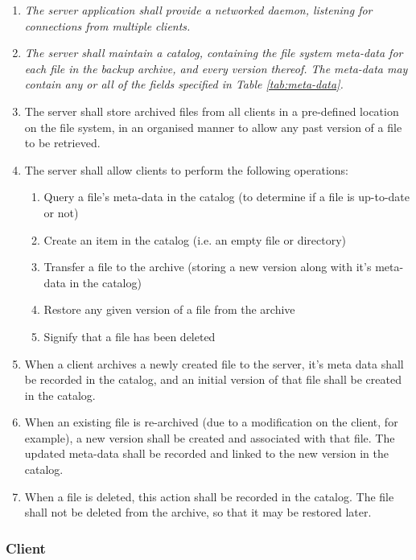 \begin{enumerate}
    \item \emph{The server application shall provide a networked daemon,
        listening for connections from multiple clients.}
    \item \emph{The server shall maintain a catalog, containing the
        file system meta-data for each file in the backup archive, and every
        version thereof. The meta-data may contain any or all of the fields
        specified in Table \ref{tab:meta-data}.}
    \item The server shall store archived files from all clients in
        a pre-defined location on the file system, in an organised manner
        to allow any past version of a file to be retrieved.
    \item The server shall allow clients to perform the following operations:
        \begin{enumerate}
            \item Query a file's meta-data in the catalog (to determine if
                a file is up-to-date or not)
            \item Create an item in the catalog (i.e. an empty file or
                directory)
            \item Transfer a file to the archive (storing a new version along
                with it's meta-data in the catalog)
            \item Restore any given version of a file from the archive
            \item Signify that a file has been deleted
        \end{enumerate}
    \item When a client archives a newly created file to the server, it's meta
        data shall be recorded in the catalog, and an initial version of that
        file shall be created in the catalog.
    \item When an existing file is re-archived (due to a modification on the
        client, for example), a new version shall be created and associated
        with that file. The updated meta-data shall be recorded and linked to
        the new version in the catalog.
    \item When a file is deleted, this action shall be recorded in the catalog.
        The file shall not be deleted from the archive, so that it may be
        restored later.
\end{enumerate}

\subsubsection{Client}

